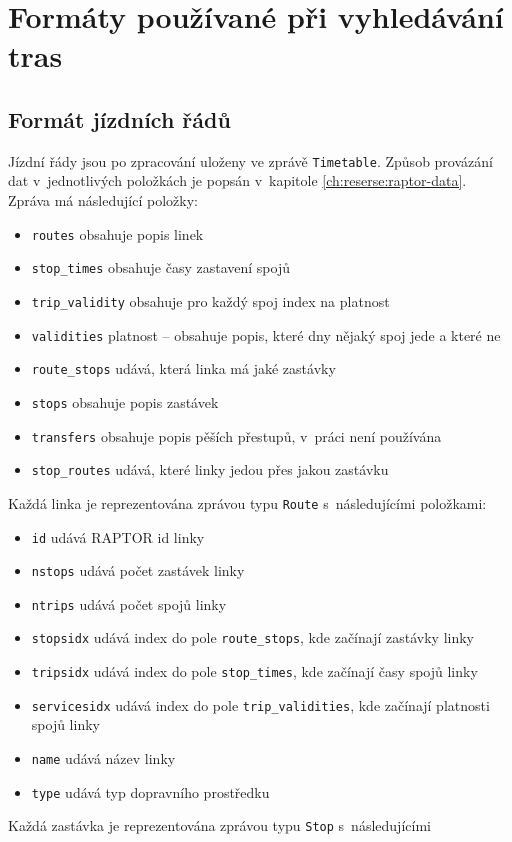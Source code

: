 \section{Formáty používané při vyhledávání tras}
\label{ch:formaty-dat:vyhledavani}
\subsection{Formát jízdních řádů}
Jízdní řády jsou po zpracování uloženy ve zprávě {\tt Timetable}. Způsob
provázání dat v~jednotlivých položkách je popsán v~kapitole
\ref{ch:reserse:raptor-data}. Zpráva má následující položky:
\begin{itemize}
	\item {\tt routes} obsahuje popis linek
	\item {\tt stop\_times} obsahuje časy zastavení spojů 
	\item {\tt trip\_validity} obsahuje pro každý spoj index na platnost 
	\item {\tt validities} platnost -- obsahuje popis, které dny nějaký spoj
	jede a které ne 
	\item {\tt route\_stops} udává, která linka má jaké zastávky 
	\item {\tt stops} obsahuje popis zastávek
	\item {\tt transfers} obsahuje popis pěších přestupů, v~práci není
	používána 
	\item {\tt stop\_routes} udává, které linky jedou přes jakou zastávku
\end{itemize} 
Každá linka je reprezentována zprávou typu {\tt Route} s~následujícími
položkami:
\begin{itemize}
	\item {\tt id} udává RAPTOR id linky 
	\item {\tt nstops} udává počet zastávek linky
	\item {\tt ntrips} udává počet spojů linky
	\item {\tt stopsidx} udává index do pole {\tt route\_stops}, kde
	začínají zastávky linky
	\item {\tt tripsidx} udává index do pole {\tt stop\_times}, kde
	začínají časy spojů linky
	\item {\tt servicesidx} udává index do pole {\tt trip\_validities}, kde
	začínají platnosti spojů linky
	\item {\tt name} udává název linky
	\item {\tt type} udává typ dopravního prostředku
\end{itemize}
Každá zastávka je reprezentována zprávou typu {\tt Stop} s~následujícími
